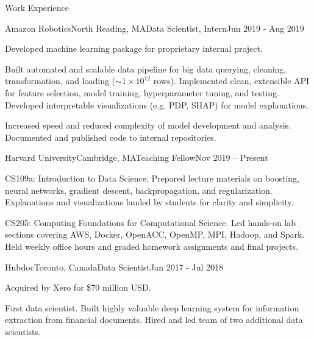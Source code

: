 \documentclass{resume} %
\begin{document}
\begin{rSection}{Work Experience}

\begin{rSubsection}{Amazon Robotics}{North Reading, MA}{Data Scientist, Intern}{Jun 2019 - Aug 2019}

\item
    Developed machine learning package for proprietary internal project.

\item
    Built automated and scalable data pipeline for big data querying, cleaning, transformation, and loading (${\sim} 1 \times 10^{12}$ rows).
    Implemented clean, extensible API for feature selection, model training, hyperparameter tuning, and testing.
    Developed interpretable visualizations (e.g. PDP, SHAP) for model explanations.

\item
    Increased speed and reduced complexity of model development and analysis.
    Documented and published code to internal repositories.

\end{rSubsection}


\begin{rSubsection}{Harvard University}{Cambridge, MA}{Teaching Fellow}{Nov 2019 -- Present}

\item
    CS109a: Introduction to Data Science. Prepared lecture materials on boosting, neural networks, gradient descent, backpropagation, and regularization.
    Explanations and visualizations lauded by students for clarity and simplicity.

\item
    CS205: Computing Foundations for Computational Science.
    Led hands-on lab sections covering AWS, Docker, OpenACC, OpenMP, MPI, Hadoop, and Spark.
    Held weekly office hours and graded homework assignments and final projects.

\end{rSubsection}


\begin{rSubsection}{Hubdoc}{Toronto, Canada}{Data Scientist}{Jan 2017 - Jul 2018}
\item
    Acquired by Xero for \$70 million USD.
\item
    First data scientist.
    Built highly valuable deep learning system for information extraction from financial documents.
    Hired and led team of two additional data scientists.


\end{rSubsection}
\end{rSection}
\end{document}
